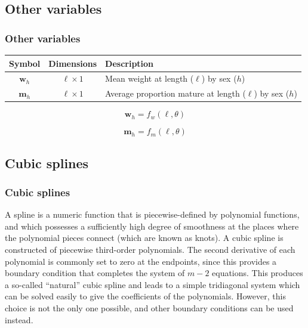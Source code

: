 \documentclass{beamer}
\begin{document}

\subsection{Other variables}
\begin{frame}
\frametitle{Other variables}

\begin{table}
  \centering
  \begin{tabular}{ccl}
  \hline
  Symbol  & Dimensions & Description \\
  \hline
      $\boldsymbol{w}_{h}$ & $\ell \times 1$ & Mean weight at length ($\ell$) by sex ($h$) \\
      $\boldsymbol{m}_{h} $ & $\ell \times 1$ & Average proportion mature at length ($\ell$) by sex ($h$) \\
  \hline
  \end{tabular}
\end{table}

\begin{equation*}
  \boldsymbol{w}_{h} = f_w(\ell,\theta)
\end{equation*}

\begin{equation*}
  \boldsymbol{m}_{h} = f_m(\ell,\theta)
\end{equation*}


\end{frame}


\subsection{Cubic splines}
\begin{frame}
\frametitle{Cubic splines}
A spline is a numeric function that is piecewise-defined by polynomial
functions, and which possesses a sufficiently high degree of smoothness at the
places where the polynomial pieces connect (which are known as knots). A cubic
spline is constructed of piecewise third-order polynomials. The second
derivative of each polynomial is commonly set to zero at the endpoints, since
this provides a boundary condition that completes the system of $m-2$
equations. This produces a so-called ``natural'' cubic spline and leads to a
simple tridiagonal system which can be solved easily to give the coefficients of
the polynomials. However, this choice is not the only one possible, and other
boundary conditions can be used instead.
\end{frame}
\end{document}
